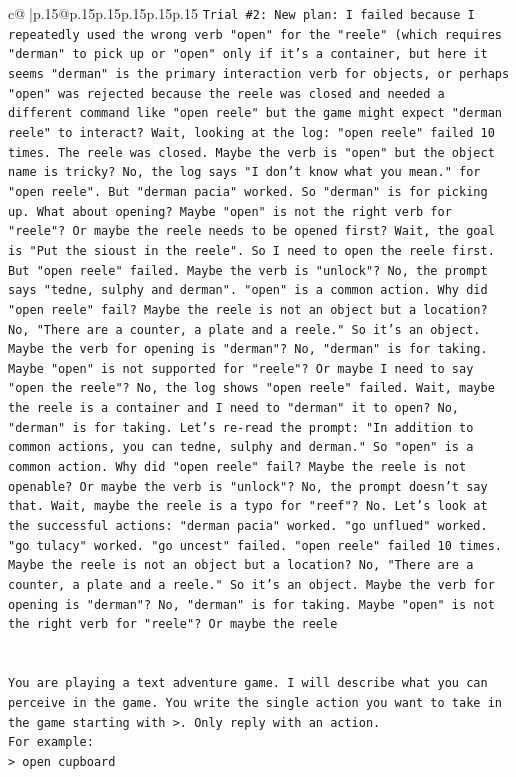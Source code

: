 \documentclass{article}
\begin{document}
{\begin{supertabular}{c@{$\;$}|p{.15\linewidth}@{}p{.15\linewidth}p{.15\linewidth}p{.15\linewidth}p{.15\linewidth}p{.15\linewidth}}
{{{\texttt{Trial \#2: New plan: I failed because I repeatedly used the wrong verb "open" for the "reele" (which requires "derman" to pick up or "open" only if it's a container, but here it seems "derman" is the primary interaction verb for objects, or perhaps "open" was rejected because the reele was closed and needed a different command like "open reele" but the game might expect "derman reele" to interact? Wait, looking at the log: "open reele" failed 10 times. The reele was closed. Maybe the verb is "open" but the object name is tricky? No, the log says "I don't know what you mean." for "open reele". But "derman pacia" worked. So "derman" is for picking up. What about opening? Maybe "open" is not the right verb for "reele"? Or maybe the reele needs to be opened first? Wait, the goal is "Put the sioust in the reele". So I need to open the reele first. But "open reele" failed. Maybe the verb is "unlock"? No, the prompt says "tedne, sulphy and derman". "open" is a common action. Why did "open reele" fail? Maybe the reele is not an object but a location? No, "There are a counter, a plate and a reele." So it's an object. Maybe the verb for opening is "derman"? No, "derman" is for taking. Maybe "open" is not supported for "reele"? Or maybe I need to say "open the reele"? No, the log shows "open reele" failed. Wait, maybe the reele is a container and I need to "derman" it to open? No, "derman" is for taking. Let's re{-}read the prompt: "In addition to common actions, you can tedne, sulphy and derman." So "open" is a common action. Why did "open reele" fail? Maybe the reele is not openable? Or maybe the verb is "unlock"? No, the prompt doesn't say that. Wait, maybe the reele is a typo for "reef"? No. Let's look at the successful actions: "derman pacia" worked. "go unflued" worked. "go tulacy" worked. "go uncest" failed. "open reele" failed 10 times. Maybe the reele is not an object but a location? No, "There are a counter, a plate and a reele." So it's an object. Maybe the verb for opening is "derman"? No, "derman" is for taking. Maybe "open" is not the right verb for "reele"? Or maybe the reele} \\
\\ 
\\ 
\texttt{You are playing a text adventure game. I will describe what you can perceive in the game. You write the single action you want to take in the game starting with >. Only reply with an action.} \\
\texttt{For example:} \\
\texttt{> open cupboard} \\
}}}
\end{supertabular}}
\end{document}
